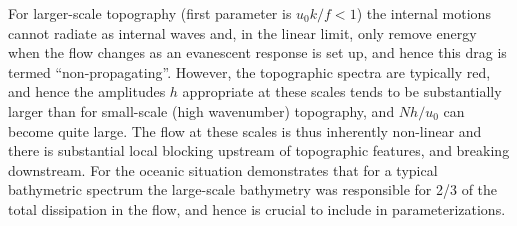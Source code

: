 \documentclass[twocol]{ametsocV5}
\begin{document}

For larger-scale topography (first parameter is $u_0k/f<1$) the internal motions cannot radiate as internal waves and, in the linear limit, only remove energy when the flow changes as an evanescent response is set up, and hence this drag is termed ``non-propagating''.  However, the topographic spectra are typically red, and hence the amplitudes $h$ appropriate at these scales tends to be substantially larger than for small-scale (high wavenumber) topography, and $Nh/u_0$ can become quite large. The flow at these scales is thus inherently non-linear and there is substantial local blocking upstream of topographic features, and breaking downstream. For the oceanic situation \citet{klymak18} demonstrates that for a typical bathymetric spectrum \citep[i.e.\ the ones used by][]{nikurashinferrari14} the large-scale bathymetry was responsible for 2/3 of the total dissipation in the flow, and hence is crucial to include in parameterizations.  
\end{document}

